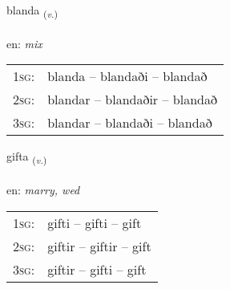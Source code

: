 \documentclass[frontgrid, backgrid]{flacards}\usepackage[]{graphicx}\usepackage[]{color}
\begin{document}
\renewcommand{\blhead}{\vskip5pt {\small\bfseries\footnotesize Sagnorð | Verb }}
\renewcommand{\bcfoot}{\vskip5pt \hspace{2pt}{\small\bfseries\footnotesize 2K}}


{blanda \small{\textsubscript{(\textit{v.})}} \\[1ex] %
\textphonetic{[planta]} \\
en: \emph{mix} \\  [2ex]
\renewcommand*{\arraystretch}{0.8}
\begin{tabular}{p{1cm}l}
\textsc{1sg}: & blanda -- blandaði -- blandað \\ 
\textsc{2sg}: & blandar -- blandaðir -- blandað \\ 
\textsc{3sg}: & blandar -- blandaði -- blandað \\ 
\end{tabular}
}

\renewcommand{\flhead}{\vskip5pt \fboxsep=0pt {\small\bfseries\footnotesize Sagnorð | Verb}}
\renewcommand{\fcfoot}{\vskip5pt \fboxsep=0pt \hspace{2pt}{\small\bfseries\footnotesize 2K}}

\renewcommand{\blhead}{\vskip5pt {\small\bfseries\footnotesize Sagnorð | Verb }}
\renewcommand{\bcfoot}{\vskip5pt \hspace{2pt}{\small\bfseries\footnotesize 2K}}


{gifta \small{\textsubscript{(\textit{v.})}} \\[1ex] %
\textphonetic{[cɪfta]} \\
en: \emph{marry, wed} \\  [2ex]
\renewcommand*{\arraystretch}{0.8}
\begin{tabular}{p{1cm}l}
\textsc{1sg}: & gifti -- gifti -- gift \\ 
\textsc{2sg}: & giftir -- giftir -- gift \\ 
\textsc{3sg}: & giftir -- gifti -- gift \\ 
\end{tabular}
}
\end{document}
